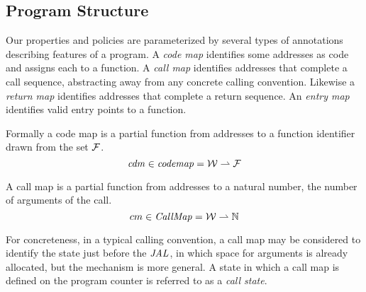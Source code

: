 \documentclass[acmsmall,review,anonymous]{acmart}\settopmatter{printfolios=true,printccs=false,printacmref=false}
\begin{document}

%




\subsection{Program Structure}

Our properties and policies are parameterized by several types of
annotations describing features of a program. A {\em code map}
identifies some addresses as code and assigns each to a function. A
{\em call map} identifies addresses that complete a call sequence,
abstracting away from any concrete calling convention. Likewise a {\em
  return map} identifies addresses that complete a return sequence. An
{\em entry map} identifies valid entry points to a function.

Formally a code map is a partial function from addresses to a function
identifier drawn from the set \(\mathcal{F}\).
\[\mathit{cdm} \in \mathit{codemap} = {\mathcal W} \rightharpoonup \mathcal{F}\]


A call map is a partial function from addresses to a natural number,
the number of arguments of the call.
\[cm \in \mathit{CallMap} = {\mathcal W} \rightharpoonup \mathbb{N}\]


For concreteness, in a typical calling convention, a call map may be
considered to identify the state just before the \(\mathit{JAL}\), in which
space for arguments is already allocated, but the mechanism is more
general. A state in which a call map is defined on the program counter
is referred to as a {\it call state}.
\end{document}
